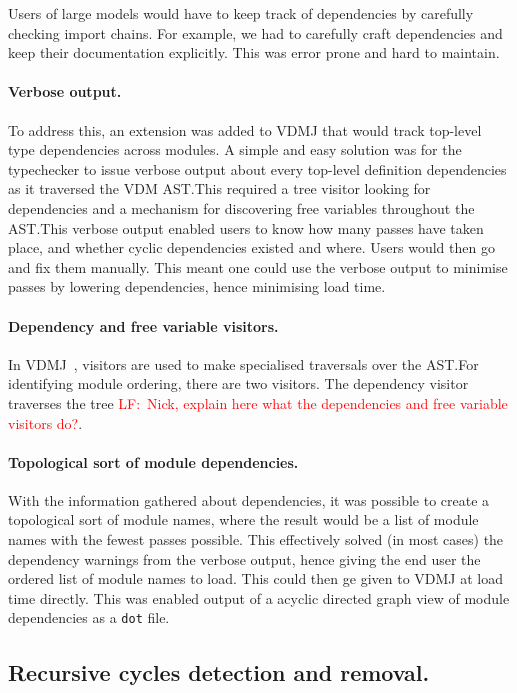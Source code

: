 \documentclass[runningheads,a4paper]{llncs}
\newcommand{\lfcomment}[1]{{\scriptsize\textcolor{red}{LF:~#1}}}
\begin{document}
Users of large models would have to keep track of dependencies by carefully checking import chains. For example, we had to carefully craft dependencies and keep their documentation explicitly. This was error prone and hard to maintain. 

\paragraph*{Verbose output.}
%
To address this, an extension was added to VDMJ that would track top-level type dependencies across modules. A simple and easy solution was for the typechecker to issue verbose output about every top-level definition dependencies as it traversed the VDM AST.\@ This required a tree visitor looking for dependencies and a mechanism for discovering free variables throughout the AST.\@ This verbose output enabled users to know how many passes have taken place, and whether cyclic dependencies existed and where. Users would then go and fix them manually. This meant one could use the verbose output to minimise passes by lowering dependencies, hence minimising load time.   

\paragraph*{Dependency and free variable visitors.}
%
In VDMJ~\cite{Battle09}, visitors are used to make specialised traversals over the AST.\@ For identifying module ordering, there are two visitors. The dependency visitor traverses the tree \lfcomment{Nick, explain here what the dependencies and free variable visitors do?}. 

\paragraph*{Topological sort of module dependencies.}
%
With the information gathered about dependencies, it was possible to create a topological sort of module names, where the result would be a list of module names with the fewest passes possible. This effectively solved (in most cases) the dependency warnings from the verbose output, hence giving the end user the ordered list of module names to load. This could then ge given to VDMJ at load time directly. This was enabled output of a acyclic directed graph view of module dependencies as a \texttt{dot} file.    

\subsection{Recursive cycles detection and removal.}
\end{document}
